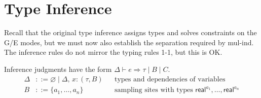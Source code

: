 \documentclass[manuscript,review,nonacm]{acmart}
\newcommand{\real}[1]{\mathsf{real}^{#1}}
\begin{document}
\section{Type Inference}
Recall that the original type inference assigns types and solves constraints on the G/E modes, but we must now also establish the separation required by mul-ind. The inference rules do not mirror the typing rules 1-1, but this is OK.

Inference judgments have the form $\Delta \vdash e \Rightarrow \tau \mid B \mid C$.
\begin{align*}
\Delta &::= \varnothing \mid \Delta,\, x:(\tau, B)
  && \text{types and dependencies of variables}\\
B &::= \{a_1,\dots,a_n\}
  && \text{sampling sites with types $\real{a_1}, \dots, \real{a_n}$}
\end{align*}
\end{document}
